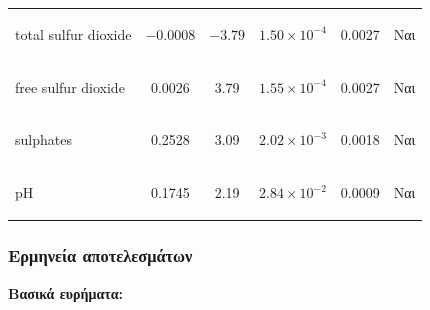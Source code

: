 \documentclass[12pt,a4paper]{article}
\begin{document}
\begin{table}[H]
\begin{tabular}{lccccc}
\begin{english}total sulfur dioxide\end{english} & $-0.0008$ & $-3.79$ & $1.50 \times 10^{-4}$ & 0.0027 & Ναι \\
\begin{english}free sulfur dioxide\end{english} & 0.0026 & 3.79 & $1.55 \times 10^{-4}$ & 0.0027 & Ναι \\
\begin{english}sulphates\end{english} & 0.2528 & 3.09 & $2.02 \times 10^{-3}$ & 0.0018 & Ναι \\
\begin{english}pH\end{english} & 0.1745 & 2.19 & $2.84 \times 10^{-2}$ & 0.0009 & Ναι \\
\bottomrule
\end{tabular}
\end{table}

\subsubsection{Ερμηνεία αποτελεσμάτων}

\textbf{Βασικά ευρήματα:}
\end{document}
